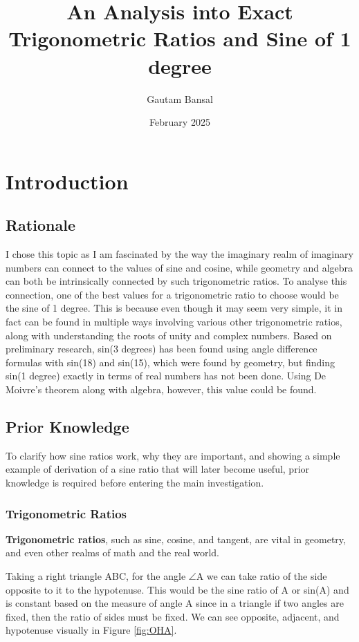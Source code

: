 \documentclass[12pt]{article}
\title{An Analysis into Exact Trigonometric Ratios and Sine of 1 degree}
\author{Gautam Bansal}
\date{February 2025}
\begin{document}
\maketitle

\section{Introduction}
   
\subsection{Rationale}
 I chose this topic as I am fascinated by the way the imaginary realm of imaginary numbers can connect to the values of sine and cosine, while geometry and algebra can both be intrinsically connected by such trigonometric ratios. To analyse this connection, one of the best values for a trigonometric ratio to choose would be the sine of 1 degree. This is because even though it may seem very simple, it in fact can be found in multiple ways involving various other trigonometric ratios, along with understanding the roots of unity and complex numbers. Based on preliminary research, sin(3 degrees) has been found using angle difference formulas with sin(18) and sin(15), which were found by geometry, but finding sin(1 degree) exactly in terms of real numbers has not been done. Using De Moivre's theorem along with algebra, however, this value could be found.  

\subsection{Prior Knowledge}
To clarify how sine ratios work, why they are important, and showing a simple example of derivation of a sine ratio that will later become useful, prior knowledge is required before entering the main investigation.
\subsubsection{Trigonometric Ratios}

\textbf{Trigonometric ratios}, such as sine, cosine, and tangent, are vital in geometry, and even other realms of math and the real world.

Taking a right triangle ABC, for the angle $\angle$A we can take ratio of the side opposite to it to the hypotenuse. This would be the sine ratio of A or sin(A) and is constant based on the measure of angle A since in a triangle if two angles are fixed, then the ratio of sides must be fixed. We can see opposite, adjacent, and hypotenuse visually in Figure \ref{fig:OHA}.
\end{document}
